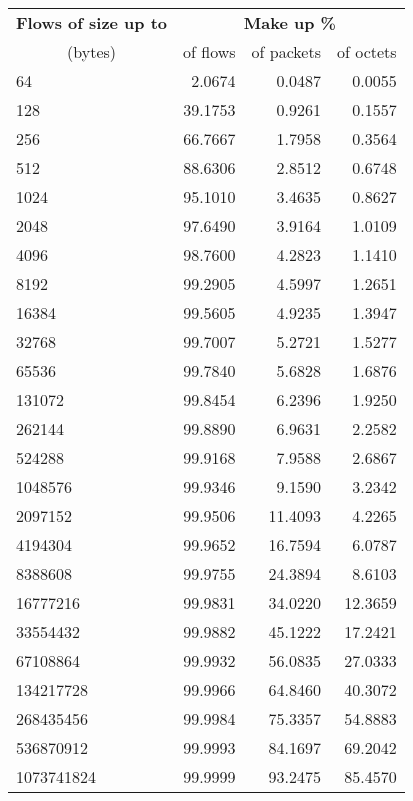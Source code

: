 \begin{tabular}{@{}lrrr@{}}
\toprule
\textbf{Flows of size up to} & \multicolumn{3}{c}{\textbf{Make up \%}} \\
\cmidrule(lr){2-4}
\multicolumn{1}{c}{(bytes)} & of flows & of packets & of octets \\
\midrule
64 & 2.0674 & 0.0487 & 0.0055 \\
128 & 39.1753 & 0.9261 & 0.1557 \\
256 & 66.7667 & 1.7958 & 0.3564 \\
512 & 88.6306 & 2.8512 & 0.6748 \\
1024 & 95.1010 & 3.4635 & 0.8627 \\
2048 & 97.6490 & 3.9164 & 1.0109 \\
4096 & 98.7600 & 4.2823 & 1.1410 \\
8192 & 99.2905 & 4.5997 & 1.2651 \\
16384 & 99.5605 & 4.9235 & 1.3947 \\
32768 & 99.7007 & 5.2721 & 1.5277 \\
65536 & 99.7840 & 5.6828 & 1.6876 \\
131072 & 99.8454 & 6.2396 & 1.9250 \\
262144 & 99.8890 & 6.9631 & 2.2582 \\
524288 & 99.9168 & 7.9588 & 2.6867 \\
1048576 & 99.9346 & 9.1590 & 3.2342 \\
2097152 & 99.9506 & 11.4093 & 4.2265 \\
4194304 & 99.9652 & 16.7594 & 6.0787 \\
8388608 & 99.9755 & 24.3894 & 8.6103 \\
16777216 & 99.9831 & 34.0220 & 12.3659 \\
33554432 & 99.9882 & 45.1222 & 17.2421 \\
67108864 & 99.9932 & 56.0835 & 27.0333 \\
134217728 & 99.9966 & 64.8460 & 40.3072 \\
268435456 & 99.9984 & 75.3357 & 54.8883 \\
536870912 & 99.9993 & 84.1697 & 69.2042 \\
1073741824 & 99.9999 & 93.2475 & 85.4570 \\
\bottomrule
\end{tabular}


